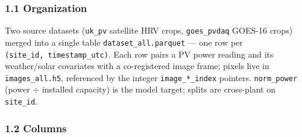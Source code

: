 \documentclass[
  9pt,
]{article}
\begin{document}
\subsubsection{1.1 Organization}\label{organization}

Two source datasets (\texttt{uk\_\allowbreak{}pv} satellite HRV crops,
\texttt{goes\_\allowbreak{}pvdaq} GOES-16 crops) merged into a single table
\texttt{dataset\_\allowbreak{}all.parquet} --- one row per
\texttt{(site\_\allowbreak{}id,\ timestamp\_\allowbreak{}utc)}. Each row pairs a PV power reading
and its weather/solar covariates with a co-registered image frame;
pixels live in \texttt{images\_\allowbreak{}all.h5}, referenced by the integer
\texttt{image\_\allowbreak{}*\_\allowbreak{}index} pointers. \texttt{norm\_\allowbreak{}power} (power \(\div\)
installed capacity) is the model target; splits are cross-plant on
\texttt{site\_\allowbreak{}id}.

\subsubsection{1.2 Columns}\label{columns}
\end{document}
